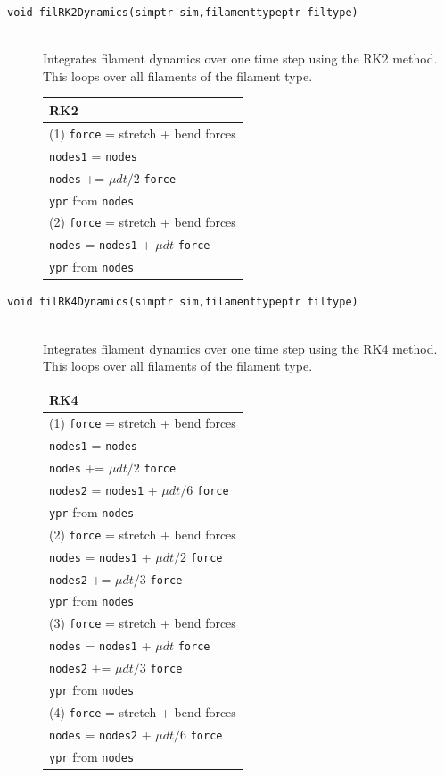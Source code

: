 \documentclass {scrbook}
\newcommand {\ttt} {\texttt}
\begin{document}
\begin{description}
\item[\ttt{void filRK2Dynamics(simptr sim,filamenttypeptr filtype)}]
\hfill \\
Integrates filament dynamics over one time step using the RK2 method. This loops over all filaments of the filament type.
\begin{longtable}[c]{l}
RK2 \\
\hline
(1) \ttt{force} = stretch + bend forces \\
\ttt{nodes1} = \ttt{nodes} \\
\ttt{nodes} += $\mu dt/2 $ \ttt{force} \\
\ttt{ypr} from \ttt{nodes} \\
(2) \ttt{force} = stretch + bend forces \\
\ttt{nodes} = \ttt{nodes1} + $\mu dt $ \ttt{force} \\
\ttt{ypr} from \ttt{nodes}
\end{longtable}

\item[\ttt{void filRK4Dynamics(simptr sim,filamenttypeptr filtype)}]
\hfill \\
Integrates filament dynamics over one time step using the RK4 method. This loops over all filaments of the filament type.
\begin{longtable}[c]{l}
RK4 \\
\hline
(1) \ttt{force} = stretch + bend forces \\
\ttt{nodes1} = \ttt{nodes} \\
\ttt{nodes} += $\mu dt/2 $ \ttt{force} \\
\ttt{nodes2} = \ttt{nodes1} + $\mu dt/6$ \ttt{force}\\
\ttt{ypr} from \ttt{nodes} \\
(2) \ttt{force} = stretch + bend forces \\
\ttt{nodes} = \ttt{nodes1} + $\mu dt/2$ \ttt{force} \\
\ttt{nodes2} += $\mu dt/3$ \ttt{force} \\
\ttt{ypr} from \ttt{nodes} \\
(3) \ttt{force} = stretch + bend forces \\
\ttt{nodes} = \ttt{nodes1} + $\mu dt$ \ttt{force} \\
\ttt{nodes2} += $\mu dt/3$ \ttt{force} \\
\ttt{ypr} from \ttt{nodes} \\
(4) \ttt{force} = stretch + bend forces \\
\ttt{nodes} = \ttt{nodes2} + $\mu dt/6$ \ttt{force} \\
\ttt{ypr} from \ttt{nodes}
\end{longtable}


\end{description}
\end{document}
